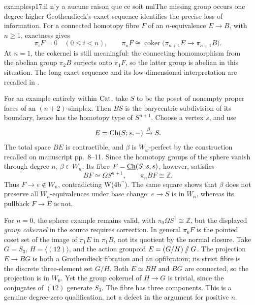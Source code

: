 \begin{dcomment}{examples}{p17:il n'y a aucune raison que ce soit nul}{The missing group occurs one degree higher}
Grothendieck's exact sequence identifies the precise loss of information. For a connected homotopy fibre \(F\) of an \(n\)-equivalence \(E\to B\), with \(n\geq1\), exactness gives
\[
 \pi_iF=0\quad(0\leq i<n),\qquad
 \pi_nF\cong
 \operatorname{coker}\bigl(\pi_{n+1}E\to\pi_{n+1}B\bigr).
\]
At \(n=1\), the cokernel is still meaningful: the connecting homomorphism from the abelian group \(\pi_2B\) surjects onto \(\pi_1F\), so the latter group is abelian in this situation. The long exact sequence and its low-dimensional interpretation are recalled in \citet[Theorem~4.41]{Hatcher2002}.

For an example entirely within \(\mathrm{Cat}\), take \(S\) to be the poset of nonempty proper faces of an \((n+2)\)-simplex. Then \(BS\) is the barycentric subdivision of its boundary, hence has the homotopy type of \(S^{n+1}\). Choose a vertex \(s\), and use
\[
 E=\underline{\mathrm{Ch}}(S;s,-)\xrightarrow{\beta}S .
\]
The total space \(BE\) is contractible, and \(\beta\) is \(W_\omega\)-perfect by the construction recalled on manuscript pp.~8--11. Since the homotopy groups of the sphere vanish through degree \(n\), \(\beta\in W_n\). Its fibre \(F=\underline{\mathrm{Ch}}(S;s,s)\), however, satisfies
\[
 BF\simeq\Omega S^{n+1},\qquad \pi_n BF\cong\mathbb Z.
\]
Thus \(F\to e\notin W_n\), contradicting W(4b\(^{\prime\prime}\)). The same square shows that \(\beta\) does not preserve all \(W_n\)-equivalences under base change: \(e\to S\) is in \(W_n\), whereas its pullback \(F\to E\) is not.

For \(n=0\), the sphere example remains valid, with \(\pi_0\Omega S^1\cong\mathbb Z\), but the displayed \emph{group cokernel} in the source requires correction. In general \(\pi_0F\) is the pointed coset set of the image of \(\pi_1E\) in \(\pi_1B\), not its quotient by the normal closure. Take \(G=S_3\), \(H=\langle(12)\rangle\), and the action groupoid \(E=(G/H)\mathbin{/\mkern-6mu/}G\). The projection \(E\to BG\) is both a Grothendieck fibration and an opfibration; its strict fibre is the discrete three-element set \(G/H\). Both \(E\simeq BH\) and \(BG\) are connected, so the projection is in \(W_0\). Yet the group cokernel of \(H\to G\) is trivial, since the conjugates of \((12)\) generate \(S_3\). The fibre has three components. This is a genuine degree-zero qualification, not a defect in the argument for positive \(n\).
\end{dcomment}


